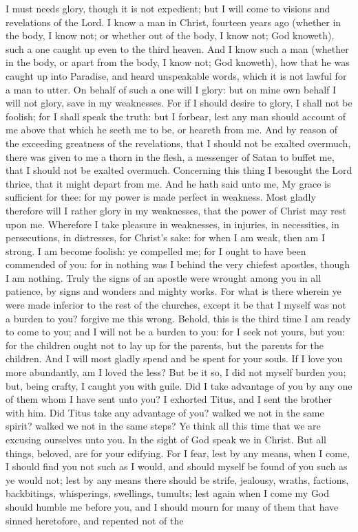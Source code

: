 I must needs glory, though it is not expedient; but I will come to visions and revelations of the Lord. I know a man in Christ, fourteen years ago (whether in the body, I know not; or whether out of the body, I know not; God knoweth), such a one caught up even to the third heaven. And I know such a man (whether in the body, or apart from the body, I know not; God knoweth), how that he was caught up into Paradise, and heard unspeakable words, which it is not lawful for a man to utter. On behalf of such a one will I glory: but on mine own behalf I will not glory, save in my weaknesses. For if I should desire to glory, I shall not be foolish; for I shall speak the truth: but I forbear, lest any man should account of me above that which he seeth me to be, or heareth from me. And by reason of the exceeding greatness of the revelations, that I should not be exalted overmuch, there was given to me a thorn in the flesh, a messenger of Satan to buffet me, that I should not be exalted overmuch. Concerning this thing I besought the Lord thrice, that it might depart from me. And he hath said unto me, My grace is sufficient for thee: for my power is made perfect in weakness. Most gladly therefore will I rather glory in my weaknesses, that the power of Christ may rest upon me. Wherefore I take pleasure in weaknesses, in injuries, in necessities, in persecutions, in distresses, for Christ’s sake: for when I am weak, then am I strong.  I am become foolish: ye compelled me; for I ought to have been commended of you: for in nothing was I behind the very chiefest apostles, though I am nothing. Truly the signs of an apostle were wrought among you in all patience, by signs and wonders and mighty works. For what is there wherein ye were made inferior to the rest of the churches, except it be that I myself was not a burden to you? forgive me this wrong.  Behold, this is the third time I am ready to come to you; and I will not be a burden to you: for I seek not yours, but you: for the children ought not to lay up for the parents, but the parents for the children. And I will most gladly spend and be spent for your souls. If I love you more abundantly, am I loved the less? But be it so, I did not myself burden you; but, being crafty, I caught you with guile. Did I take advantage of you by any one of them whom I have sent unto you? I exhorted Titus, and I sent the brother with him. Did Titus take any advantage of you? walked we not in the same spirit? walked we not in the same steps?  Ye think all this time that we are excusing ourselves unto you. In the sight of God speak we in Christ. But all things, beloved, are for your edifying. For I fear, lest by any means, when I come, I should find you not such as I would, and should myself be found of you such as ye would not; lest by any means there should be strife, jealousy, wraths, factions, backbitings, whisperings, swellings, tumults; lest again when I come my God should humble me before you, and I should mourn for many of them that have sinned heretofore, and repented not of the 